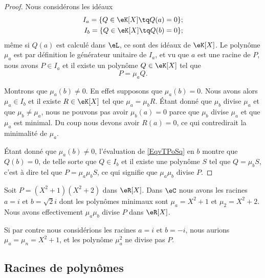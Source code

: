 \begin{proof}
    Nous considérons les idéaux
    \begin{subequations}
        \begin{align}
            I_a=\{ Q\in \eK[X]\tq Q(a)=0 \};\\
            I_b=\{ Q\in \eK[X]\tq Q(b)=0 \};
        \end{align}
    \end{subequations}
    même si \( Q(a)\) est calculé dans \( \eL\), ce sont des idéaux de \( \eK[X]\). Le polynôme \( \mu_a\) est par définition le générateur unitaire de \( I_a\), et vu que \( a\) est une racine de \( P\), nous avons \( P\in I_a\) et il existe un polynôme \( Q\in \eK[X]\) tel que 
    \begin{equation}    \label{EqvTPoSq}
        P=\mu_aQ.
    \end{equation}

    Montrons que \( \mu_a(b)\neq 0\). En effet supposons que \( \mu_a(b)=0\). Nous avons alors \( \mu_a\in I_b\) et il existe \( R\in \eK[X]\) tel que \( \mu_a=\mu_bR\). Étant donné que \( \mu_b\) divise \( \mu_a\) et que \( \mu_b\neq \mu_a\), nous ne pouvons pas avoir \( \mu_b(a)=0\) parce que \( \mu_b\) divise \( \mu_a\) et que \( \mu_a\) est minimal. Du coup nous devons avoir \( R(a)=0\), ce qui contredirait la minimalité de \( \mu_a\).

    Étant donné que \( \mu_a(b)\neq 0\), l'évaluation de \eqref{EqvTPoSq} en \( b\) montre que \( Q(b)=0\), de telle sorte que \( Q\in I_b\) et il existe une polynôme \( S\) tel que \( Q=\mu_bS\), c'est à dire tel que \( P=\mu_a\mu_bS\), ce qui signifie que \( \mu_a\mu_b\) divise \( P\).
\end{proof}

\begin{example}
    Soit \( P=(X^2+1)(X^2+2)\) dans \( \eR[X]\). Dans \( \eC\) nous avons les racines \( a=i\) et \( b=\sqrt{2}i\) dont les polynômes minimaux sont \( \mu_a=X^2+1\) et \( \mu_2=X^2+2\). Nous avons effectivement \( \mu_a\mu_b\) divise \( P\) dans \( \eR[X]\).

    Si par contre nous considérions les racines \( a=i\) et \( b=-i\), nous aurions \( \mu_a=\mu_n=X^2+1\), et les polynôme \( \mu_a^2\) ne divise pas \( P\).
\end{example}

\subsection{Racines de polynômes}

